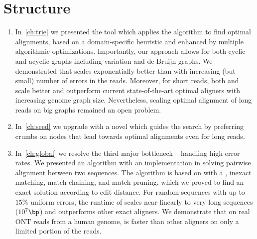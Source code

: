 \section*{Structure}

\begin{enumerate}
	\item In~\cref{ch:trie} we presented the tool \astarix which applies the \A
algorithm to find optimal alignments, based on a domain-specific heuristic and
enhanced by multiple algorithmic optimizations. Importantly, our approach allows
for both cyclic and acyclic graphs including variation and de Bruijn graphs. We
demonstrated that \astarix scales exponentially better than \dijkstra with
increasing (but small) number of errors in the reads. Moreover, for short reads,
both \astarix and \dijkstra scale better and outperform current state-of-the-art
optimal aligners with increasing genome graph size. Nevertheless, scaling
optimal alignment of long reads on big graphs remained an open problem.
	\item In~\cref{ch:seed} we upgrade \astarix with a novel \seedh which guides
the search by preferring crumbs on nodes that lead towards optimal alignments
even for long reads.
	\item In~\cref{ch:global} we resolve the third major bottleneck -- handling
high error rates. We presented an algorithm with an implementation in \astarpa
solving pairwise alignment between two sequences. The algorithm is based on \A
with a \sh, inexact matching, match chaining, and match pruning, which we proved
to find an exact solution according to edit distance. For random sequences with
up to $15\%$ uniform errors, the runtime of \astarpa scales near-linearly to
very long sequences ($10^7\bp$) and outperforms other exact aligners. We
demonstrate that on real ONT reads from a human genome, \astarpa is faster than
other aligners on only a limited portion of the reads.
\end{enumerate}